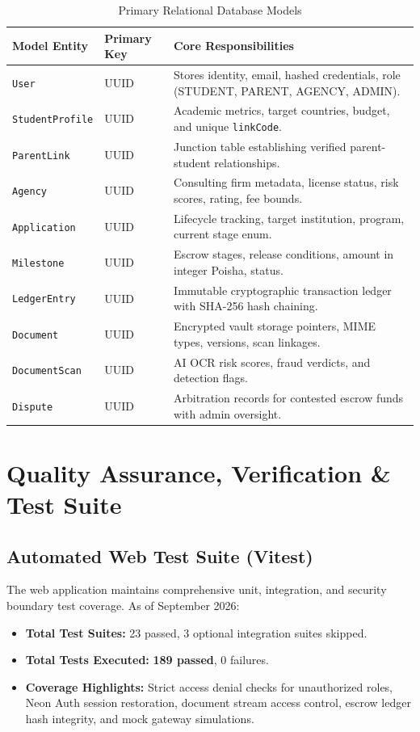 \documentclass[11pt,a4paper]{article}
\begin{document}
\begin{table}[htbp]
\centering
\small
\begin{tabularx}{\textwidth}{llX}
\toprule
\textbf{Model Entity} & \textbf{Primary Key} & \textbf{Core Responsibilities} \\
\midrule
\texttt{User} & UUID & Stores identity, email, hashed credentials, role (STUDENT, PARENT, AGENCY, ADMIN). \\
\texttt{StudentProfile} & UUID & Academic metrics, target countries, budget, and unique \texttt{linkCode}. \\
\texttt{ParentLink} & UUID & Junction table establishing verified parent-student relationships. \\
\texttt{Agency} & UUID & Consulting firm metadata, license status, risk scores, rating, fee bounds. \\
\texttt{Application} & UUID & Lifecycle tracking, target institution, program, current stage enum. \\
\texttt{Milestone} & UUID & Escrow stages, release conditions, amount in integer Poisha, status. \\
\texttt{LedgerEntry} & UUID & Immutable cryptographic transaction ledger with SHA-256 hash chaining. \\
\texttt{Document} & UUID & Encrypted vault storage pointers, MIME types, versions, scan linkages. \\
\texttt{DocumentScan} & UUID & AI OCR risk scores, fraud verdicts, and detection flags. \\
\texttt{Dispute} & UUID & Arbitration records for contested escrow funds with admin oversight. \\
\bottomrule
\end{tabularx}
\caption{Primary Relational Database Models}
\label{tab:models}
\end{table}

\section{Quality Assurance, Verification \& Test Suite}

\subsection{Automated Web Test Suite (Vitest)}
The web application maintains comprehensive unit, integration, and security boundary test coverage. As of September 2026:
\begin{itemize}
    \item \textbf{Total Test Suites:} 23 passed, 3 optional integration suites skipped.
    \item \textbf{Total Tests Executed:} \textbf{189 passed}, 0 failures.
    \item \textbf{Coverage Highlights:} Strict access denial checks for unauthorized roles, Neon Auth session restoration, document stream access control, escrow ledger hash integrity, and mock gateway simulations.
\end{itemize}
\end{document}
